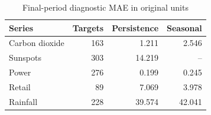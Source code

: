 \begin{table}[t]
\caption{Final-period diagnostic MAE in original units}
\label{tab:baselines}
\centering\footnotesize
\begin{tabular}{lrrr}
\toprule
Series & Targets & Persistence & Seasonal \\
\midrule
Carbon dioxide & 163 & 1.211 & 2.546 \\
Sunspots & 303 & 14.219 & -- \\
Power & 276 & 0.199 & 0.245 \\
Retail & 89 & 7.069 & 3.978 \\
Rainfall & 228 & 39.574 & 42.041 \\
\bottomrule
\end{tabular}
\end{table}
